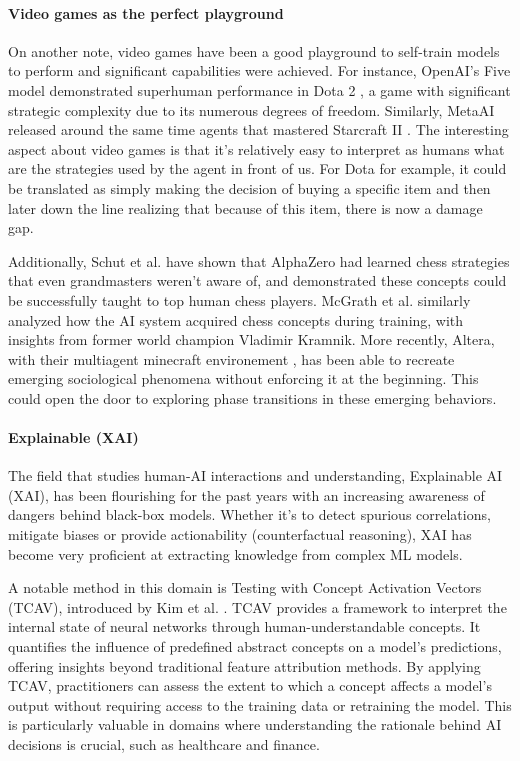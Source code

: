 \documentclass[11pt]{article}
\begin{document}
\paragraph{Video games as the perfect playground}On another note, video games have been a good playground to self-train models to perform and significant capabilities were achieved.
For instance, OpenAI's Five model demonstrated superhuman performance in Dota 2 \cite{openai_five}, a game with significant strategic complexity due to its numerous degrees of freedom. Similarly, MetaAI released around the same time agents that mastered Starcraft II \cite{fair_starcraft}.
The interesting aspect about video games is that it's relatively easy to interpret as humans what are the strategies used by the agent in front of us. For Dota for example, it could be translated as simply making the decision of buying a specific item and then later down the line realizing that because of this item, there is now a damage gap.

Additionally, Schut et al. \cite{schut} have shown that AlphaZero had learned chess strategies that even grandmasters weren't aware of, and demonstrated these concepts could be successfully taught to top human chess players. McGrath et al. \cite{alphazero-chess} similarly analyzed how the AI system acquired chess concepts during training, with insights from former world champion Vladimir Kramnik.
More recently, Altera, with their multiagent minecraft environement \cite{altera}, has been able to recreate emerging sociological phenomena without enforcing it at the beginning. This could open the door to exploring phase transitions in these emerging behaviors.

\paragraph{Explainable (XAI)}The field that studies human-AI interactions and understanding, Explainable AI (XAI), has been flourishing for the past years with an increasing awareness of dangers behind black-box models. Whether it's to detect spurious correlations, mitigate biases or provide actionability (counterfactual reasoning), XAI has become very proficient at extracting knowledge from complex ML models.

A notable method in this domain is Testing with Concept Activation Vectors (TCAV), introduced by Kim et al. \cite{tcav}. TCAV provides a framework to interpret the internal state of neural networks through human-understandable concepts. It quantifies the influence of predefined abstract concepts on a model's predictions, offering insights beyond traditional feature attribution methods.
By applying TCAV, practitioners can assess the extent to which a concept affects a model's output without requiring access to the training data or retraining the model. This is particularly valuable in domains where understanding the rationale behind AI decisions is crucial, such as healthcare and finance.
\end{document}
